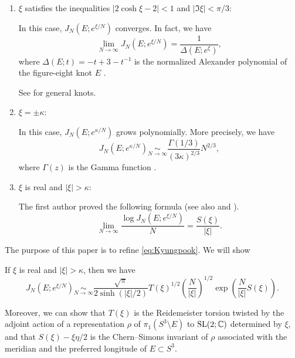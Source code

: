 \begin{enumerate}
\item
$\xi$ satisfies the inequalities $|2\cosh{\xi}-2|<1$ and $|\Im{\xi}|<\pi/3$:
\par
In this case, $J_{N}\left(E;e^{\xi/N}\right)$ converges.
In fact, we have
\begin{equation*}
  \lim_{N\to\infty}
  J_{N}\left(E;e^{\xi/N}\right)
  =
  \frac{1}{\Delta(E;e^{\xi})},
\end{equation*}
where $\Delta(E;t)=-t+3-t^{-1}$ is the normalized Alexander polynomial of the figure-eight knot $E$
\cite[Theorem~1.1]{Murakami:JPJGT2007}.
\par
See \cite{Garoufalidis/Le:GEOTO2011} for general knots.
\item
$\xi=\pm\kappa$:
\par
In this case, $J_{N}\left(E;e^{\kappa/N}\right)$ grows polynomially.
More precisely, we have
\begin{equation*}
  J_{N}\left(E;e^{\kappa/N}\right)
  \underset{N\to\infty}{\sim}
  \frac{\Gamma(1/3)}{(3\kappa)^{2/3}}N^{2/3},
\end{equation*}
where $\Gamma(z)$ is the Gamma function \cite[Theorem~1.1]{Hikami/Murakami:COMCM2008}.
\item
$\xi$ is real and $|\xi|>\kappa$:
\par
The first author proved the following formula \cite[Theorem~8.1]{Murakami:KYUMJ2004} (see also \cite[Theorem~3.2]{Murakami:ACTMV2008} and \cite[Lemma~6.7]{Murakami:Novosibirsk}).
\begin{equation}\label{eq:Kyungpook}
  \lim_{N\to\infty}
  \frac{\log J_{N}(E;e^{\xi/N})}{N}
  =
  \frac{S(\xi)}{|\xi|}.
\end{equation}
\end{enumerate}
\par
The purpose of this paper is to refine \eqref{eq:Kyungpook}.
We will show
\begin{thm}\label{thm:main}
If $\xi$ is real and $|\xi|>\kappa$, then we have
\begin{equation*}
  J_{N}\left(E;e^{\xi/N}\right)
  \underset{N\to\infty}{\sim}
  \frac{\sqrt{\pi}}{2\sinh(|\xi|/2)}T(\xi)^{1/2}\left(\frac{N}{|\xi|}\right)^{1/2}
  \exp\left(\frac{N}{|\xi|}S(\xi)\right).
\end{equation*}
\end{thm}
Moreover, we can show that $T(\xi)$ is the Reidemeister torsion twisted by the adjoint action of a representation $\rho$ of $\pi_1(S^3\setminus{E})$ to $\rm{SL}(2;\mathbb{C})$ determined by $\xi$, and that $S(\xi)-\xi\eta/2$ is the Chern--Simons invariant of $\rho$ associated with the meridian and the preferred longitude of $E\subset S^{3}$.
